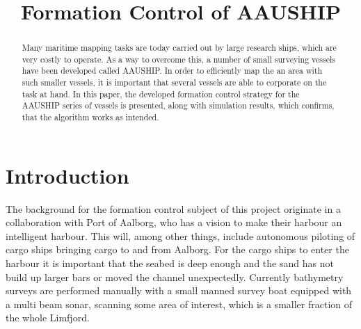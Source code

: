 \documentclass[a4paper,conference]{IEEEtran}
\begin{document}
\title{\vspace{-2cm}Formation Control of AAUSHIP}
\author{
\and
{}
\and
{}

}
\maketitle


\begin{abstract}
Many maritime mapping tasks are today carried out by large research ships, which are very costly to operate. As a way to overcome this, a number of small surveying vessels have been developed called AAUSHIP. In order to efficiently map the an area with such smaller vessels, it is important that several vessels are able to corporate on the task at hand. In this paper, the developed formation control strategy for the AAUSHIP series of vessels is presented, along with simulation results, which confirms, that the algorithm works as intended.
\end{abstract}
\vspace{-3mm}
\section{Introduction}
The background for the formation control subject of this project
originate in a collaboration with Port of Aalborg, who has a vision to
make their harbour an intelligent harbour. This will, among other
things, include autonomous piloting of cargo ships bringing cargo to and from
Aalborg. For the cargo ships to enter the harbour it is important that
the seabed is deep enough and the sand has not build up larger bars or
moved the channel unexpectedly.  Currently bathymetry surveys are
performed manually with a small manned survey boat equipped with a
multi beam sonar, scanning some area of interest, which is a smaller
fraction of the whole Limfjord.
\end{document}
